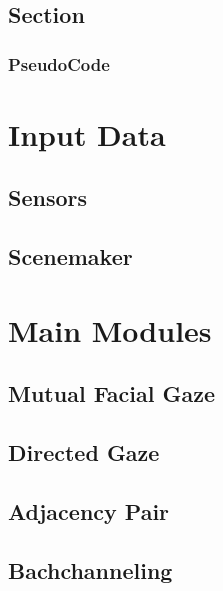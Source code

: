 \documentclass[12pt, a4paper, fleqn]{memoir}%
\begin{document}
\section{Section}
\label{sec:Section}

\subsection{PseudoCode}
\label{sec:PseudoCode}

\chapter{Input Data}
\label{chap:InputData}

\section{Sensors}
\label{sec:Sensors}

\section{Scenemaker}
\label{sec:Scenemaker}

\chapter{Main Modules}
\label{chap:MainModules}

\section{Mutual Facial Gaze}
\label{sec:MutualFacialGaze}

\section{Directed Gaze}
\label{sec:DirectedGaze}

\section{Adjacency Pair}
\label{sec:AdjacencyPair}

\section{Bachchanneling}
\label{sec:Bachchanneling}
\end{document}
